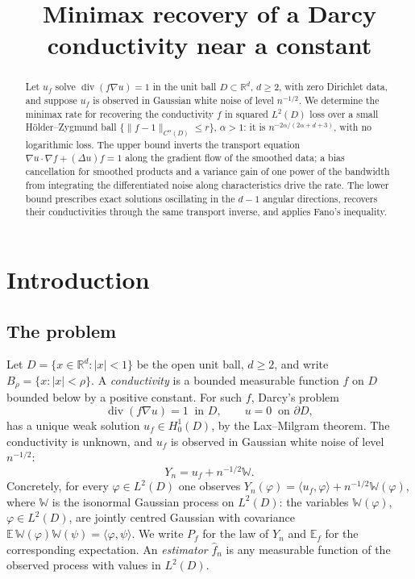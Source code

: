 \documentclass[12pt]{article}
\title{Minimax recovery of a Darcy conductivity near a constant}
\author{}
\date{}
\numberwithin{equation}{section}
\newcommand{\R}{\mathbb R}
\newcommand{\E}{\mathbb E}
\newcommand{\diver}{\operatorname{div}}
\begin{document}
\maketitle

\begin{abstract}
Let $u_f$ solve $\diver(f\nabla u)=1$ in the unit ball $D\subset\R^d$,
$d\ge2$, with zero Dirichlet data, and suppose $u_f$ is observed in
Gaussian white noise of level $n^{-1/2}$. We determine the minimax rate
for recovering the conductivity $f$ in squared $L^2(D)$ loss over a
small H\"older--Zygmund ball $\{\|f-1\|_{C^\alpha(D)}\le r\}$,
$\alpha>1$: it is $n^{-2\alpha/(2\alpha+d+3)}$, with no logarithmic
loss. The upper bound inverts the transport equation
$\nabla u\cdot\nabla f+(\Delta u)f=1$ along the gradient flow of the
smoothed data; a bias cancellation for smoothed products
and a variance gain of one power of the bandwidth from integrating the
differentiated noise along characteristics drive the rate. The lower
bound prescribes exact solutions oscillating in the $d-1$ angular
directions, recovers their conductivities through the same transport
inverse, and applies Fano's inequality.
\end{abstract}

\section{Introduction}

\subsection{The problem}

Let $D=\{x\in\R^d:|x|<1\}$ be the open unit ball, $d\ge2$, and write
$B_\rho=\{x:|x|<\rho\}$. A \emph{conductivity} is a bounded measurable
function $f$ on $D$ bounded below by a positive constant. For such
$f$, Darcy's problem
\begin{equation}\label{eq:pde}
 \diver(f\nabla u)=1\ \text{ in }D,\qquad u=0\ \text{ on }\partial D,
\end{equation}
has a unique weak solution $u_f\in H^1_0(D)$, by the Lax--Milgram
theorem. The conductivity is unknown, and $u_f$ is observed in Gaussian
white noise of level $n^{-1/2}$:
\begin{equation}\label{eq:model}
 Y_n=u_f+n^{-1/2}\mathbb W .
\end{equation}
Concretely, for every $\varphi\in L^2(D)$ one observes
$Y_n(\varphi)=\langle u_f,\varphi\rangle+n^{-1/2}\mathbb W(\varphi)$,
where $\mathbb W$ is the isonormal Gaussian process on $L^2(D)$: the
variables $\mathbb W(\varphi)$, $\varphi\in L^2(D)$, are jointly
centred Gaussian with covariance
$\E\,\mathbb W(\varphi)\mathbb W(\psi)=\langle\varphi,\psi\rangle$.
We write $P_f$ for the law of $Y_n$ and $\E_f$ for the corresponding
expectation. An \emph{estimator} $\widehat f_n$ is any measurable
function of the observed process with values in $L^2(D)$.
\end{document}
